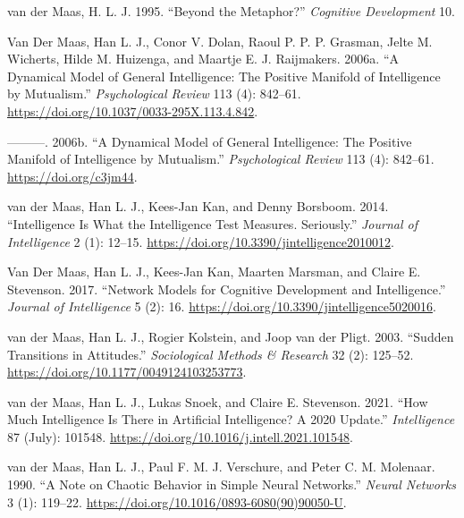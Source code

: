\documentclass[
  letterpaper,
]{scrbook}
\newlength{\cslhangindent}
\newlength{\cslentryspacingunit} %
\newenvironment{CSLReferences}[2] %
 {%
  \setlength{\parindent}{0pt}
  \ifodd #1
  \let\oldpar\par
  \def\par{\hangindent=\cslhangindent\oldpar}
  \fi
  \setlength{\parskip}{#2\cslentryspacingunit}
 }%
 {}
\begin{document}
\begin{CSLReferences}{1}{0}
\leavevmode{}%
van der Maas, H. L. J. 1995. {``Beyond the Metaphor?''} \emph{Cognitive
Development} 10.

\leavevmode{}%
Van Der Maas, Han L. J., Conor V. Dolan, Raoul P. P. P. Grasman, Jelte
M. Wicherts, Hilde M. Huizenga, and Maartje E. J. Raijmakers. 2006a.
{``A Dynamical Model of General Intelligence: The Positive Manifold of
Intelligence by Mutualism.''} \emph{Psychological Review} 113 (4):
842--61. \url{https://doi.org/10.1037/0033-295X.113.4.842}.

\leavevmode{}%
---------. 2006b. {``A Dynamical Model of General Intelligence: {The}
Positive Manifold of Intelligence by Mutualism.''} \emph{Psychological
Review} 113 (4): 842--61. \url{https://doi.org/c3jm44}.

\leavevmode{}%
van der Maas, Han L. J., Kees-Jan Kan, and Denny Borsboom. 2014.
{``Intelligence {Is What} the {Intelligence Test Measures}.
{Seriously}.''} \emph{Journal of Intelligence} 2 (1): 12--15.
\url{https://doi.org/10.3390/jintelligence2010012}.

\leavevmode{}%
Van Der Maas, Han L. J., Kees-Jan Kan, Maarten Marsman, and Claire E.
Stevenson. 2017. {``Network {Models} for {Cognitive Development} and
{Intelligence}.''} \emph{Journal of Intelligence} 5 (2): 16.
\url{https://doi.org/10.3390/jintelligence5020016}.

\leavevmode{}%
van der Maas, Han L. J., Rogier Kolstein, and Joop van der Pligt. 2003.
{``Sudden {Transitions} in {Attitudes}.''} \emph{Sociological Methods \&
Research} 32 (2): 125--52.
\url{https://doi.org/10.1177/0049124103253773}.

\leavevmode{}%
van der Maas, Han L. J., Lukas Snoek, and Claire E. Stevenson. 2021.
{``How Much Intelligence Is There in Artificial Intelligence? {A} 2020
Update.''} \emph{Intelligence} 87 (July): 101548.
\url{https://doi.org/10.1016/j.intell.2021.101548}.

\leavevmode{}%
van der Maas, Han L. J., Paul F. M. J. Verschure, and Peter C. M.
Molenaar. 1990. {``A Note on Chaotic Behavior in Simple Neural
Networks.''} \emph{Neural Networks} 3 (1): 119--22.
\url{https://doi.org/10.1016/0893-6080(90)90050-U}.


\end{CSLReferences}
\end{document}
